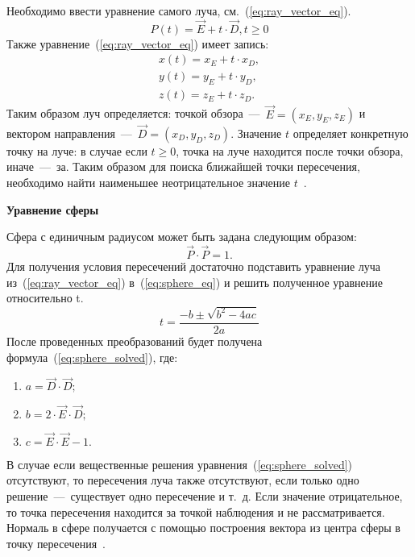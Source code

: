 Необходимо ввести уравнение самого луча, см.~(\ref{eq:ray_vector_eq}).
\begin{equation} 
	P(t) = \vec{E} +t \cdot \vec{D},t \ge 0
	\label{eq:ray_vector_eq}
\end{equation}
Также уравнение~(\ref{eq:ray_vector_eq}) имеет запись:
\begin{equation}
	\label{eq:ray_scalar_eq}
	\begin{aligned}
		x(t) = x_E + t \cdot x_D, \\
		y(t) = y_E + t \cdot y_D, \\
		z(t) = z_E + t \cdot z_D.
	\end{aligned}
\end{equation}
Таким образом луч определяется: точкой обзора~---~$\vec{E} = (x_E,y_E,z_E)$ и вектором направления~---~$\vec{D} = (x_D,y_D,z_D)$. Значение $t$  определяет конкретную точку на луче: в случае если $t \ge 0$,
точка на луче находится после точки обзора, иначе~---~за. Таким образом для поиска ближайшей точки пересечения, необходимо найти наименьшее неотрицательное значение $t$~\cite{Rodgers,primitives_raytracing_equations}.


\textbf{Уравнение сферы}

Сфера с единичным радиусом может быть задана следующим образом:
\begin{equation}
	\vec{P} \cdot \vec{P}=1.
	\label{eq:sphere_eq}
\end{equation}
Для получения условия пересечений достаточно подставить уравнение луча из~(\ref{eq:ray_vector_eq}) в~(\ref{eq:sphere_eq}) и решить полученное уравнение относительно t.
\begin{equation}
	t=\frac{-b\pm\sqrt{b^2-4ac}}{2a}
	\label{eq:sphere_solved}
\end{equation}
После проведенных преобразований будет получена формула~(\ref{eq:sphere_solved}), где:
\begin{enumerate}
	\item $a = \vec{D} \cdot \vec{D};$
	\item $b = 2 \cdot \vec{E} \cdot \vec{D};$ 
	\item $c = \vec{E} \cdot \vec{E} - 1.$
\end{enumerate}
В случае если вещественные решения уравнения~(\ref{eq:sphere_solved}) отсутствуют, то пересечения луча также отсутствуют, если только одно решение~---~существует одно
пересечение и т.~д. Если значение отрицательное, то точка пересечения находится за точкой наблюдения и не рассматривается. Нормаль в сфере получается с помощью построения вектора из центра сферы в точку пересечения~\cite{primitives_raytracing_equations}.

